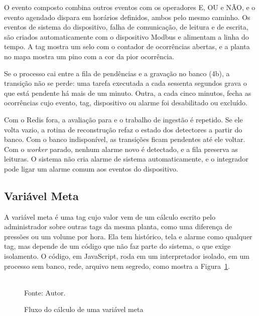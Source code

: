 \par O evento composto combina outros eventos com os operadores E, OU e NÃO, e o evento agendado dispara em horários definidos, ambos pelo mesmo caminho. Os eventos de sistema do dispositivo, falha de comunicação, de leitura e de escrita, são criados automaticamente com o dispositivo Modbus e alimentam a linha do tempo. A tag mostra um selo com o contador de ocorrências abertas, e a planta no mapa mostra um pino com a cor da pior ocorrência.

\par Se o processo cai entre a fila de pendências e a gravação no banco (4b), a transição não se perde: uma tarefa executada a cada sessenta segundos grava o que está pendente há mais de um minuto. Outra, a cada cinco minutos, fecha as ocorrências cujo evento, tag, dispositivo ou alarme foi desabilitado ou excluído.

\par Com o Redis fora, a avaliação para e o trabalho de ingestão é repetido. Se ele volta vazio, a rotina de reconstrução refaz o estado dos detectores a partir do banco. Com o banco indisponível, as transições ficam pendentes até ele voltar. Com o \emph{worker} parado, nenhum alarme novo é detectado, e a fila preserva as leituras. O sistema não cria alarme de sistema automaticamente, e o integrador pode ligar um alarme comum aos eventos do dispositivo.

\subsection{Variável Meta}

\par A variável meta é uma tag cujo valor vem de um cálculo escrito pelo administrador sobre outras tags da mesma planta, como uma diferença de pressões ou um volume por hora. Ela tem histórico, tela e alarme como qualquer tag, mas depende de um código que não faz parte do sistema, o que exige isolamento. O código, em JavaScript, roda em um interpretador isolado, em um processo sem banco, rede, arquivo nem segredo, como mostra a Figura~\ref{fig:fx_meta}.

\begin{figure}[H]
    \centering
    \caption{Fluxo do cálculo de uma variável meta}
    \label{fig:fx_meta}
    \vspace{0.4cm}
    \vspace{0.2cm} \\
    Fonte: Autor.
\end{figure}

